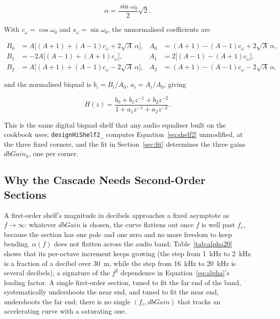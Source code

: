 \documentclass[11pt,a4paper]{article}
\begin{document}
\begin{equation}
\alpha = \frac{\sin\omega_0}{2}\sqrt{2} .
\end{equation}

With $c_\omega = \cos\omega_0$ and $s_\omega=\sin\omega_0$, the unnormalised coefficients are

\begin{align}
B_0 &= A\big[(A+1) + (A-1)c_\omega + 2\sqrt{A}\,\alpha\big], &
A_0 &= (A+1) - (A-1)c_\omega + 2\sqrt{A}\,\alpha, \\
B_1 &= -2A\big[(A-1) + (A+1)c_\omega\big], &
A_1 &= 2\big[(A-1) - (A+1)c_\omega\big], \\
B_2 &= A\big[(A+1) + (A-1)c_\omega - 2\sqrt{A}\,\alpha\big], &
A_2 &= (A+1) - (A-1)c_\omega - 2\sqrt{A}\,\alpha,
\end{align}

and the normalised biquad is $b_i = B_i/A_0$, $a_i = A_i/A_0$, giving

\begin{equation}
H(z) = \frac{b_0 + b_1 z^{-1} + b_2 z^{-2}}{1 + a_1 z^{-1} + a_2 z^{-2}} .
\label{eq:shelf2}
\end{equation}

This is the same digital biquad shelf that any audio equaliser built on the cookbook uses; \texttt{designHiShelf2\_} computes Equation~\eqref{eq:shelf2} unmodified, at the three fixed corners, and the fit in Section~\ref{sec:fit} determines the three gains $\mathit{dbGain}_k$, one per corner.

\subsection{Why the Cascade Needs Second-Order Sections}

A first-order shelf's magnitude in decibels approaches a fixed asymptote as $f\to\infty$: whatever $\mathit{dbGain}$ is chosen, the curve flattens out once $f$ is well past $f_c$, because the section has one pole and one zero and no more freedom to keep bending.
$\alpha(f)$ does not flatten across the audio band; Table~\ref{tab:alpha20} shows that its per-octave increment keeps growing (the step from \SI{1}{\kilo\hertz} to \SI{2}{\kilo\hertz} is a fraction of a decibel over \SI{30}{\meter}, while the step from \SI{16}{\kilo\hertz} to \SI{20}{\kilo\hertz} is several decibels), a signature of the $f^2$ dependence in Equation~\eqref{eq:alpha}'s leading factor.
A single first-order section, tuned to fit the far end of the band, systematically undershoots the near end, and tuned to fit the near end, undershoots the far end; there is no single $(f_c,\mathit{dbGain})$ that tracks an accelerating curve with a saturating one.
\end{document}
